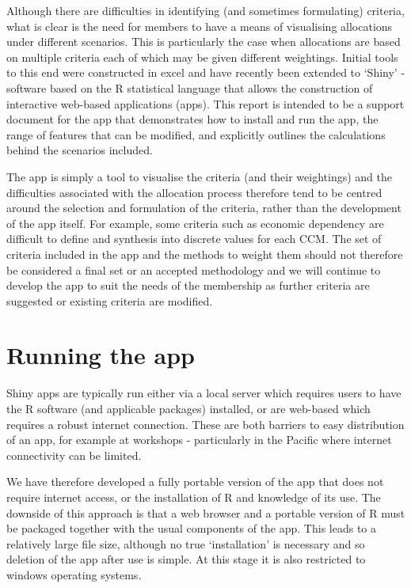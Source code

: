 \documentclass[11pt]{article}
\begin{document}
Although there are difficulties in identifying (and sometimes formulating) criteria, what is clear is the need for members to have a means of visualising allocations under different scenarios. This is particularly the case when allocations are based on multiple criteria each of which may be given different weightings. Initial tools to this end were constructed in excel and have recently been extended to `Shiny' - software based on the R statistical language that allows the construction of interactive web-based applications (apps). This report is intended to be a support document for the app that demonstrates how to install and run the app, the range of features that can be modified, and explicitly outlines the calculations behind the scenarios included.

The app is simply a tool to visualise the criteria (and their weightings) and the difficulties associated with the allocation process therefore tend to be centred around the selection and formulation of the criteria, rather than the development of the app itself. For example, some criteria such as economic dependency are difficult to define and synthesis into discrete values for each CCM. The set of criteria included in the app and the methods to weight them should not therefore be considered a final set or an accepted methodology and we will continue to develop the app to suit the needs of the membership as further criteria are suggested or existing criteria are modified.

\section{Running the app}
Shiny apps are typically run either via a local server which requires users to have the R software (and applicable packages) installed, or are web-based which requires a robust internet connection. These are both barriers to easy distribution of an app, for example at workshops - particularly in the Pacific where internet connectivity can be limited.

We have therefore developed a fully portable version of the app that does not require internet access, or the installation of R and knowledge of its use. The downside of this approach is that a web browser and a portable version of R must be packaged together with the usual components of the app. This leads to a relatively large file size, although  no true `installation' is necessary and so deletion of the app after use is simple. At this stage it is also restricted to windows operating systems. 
\end{document}
